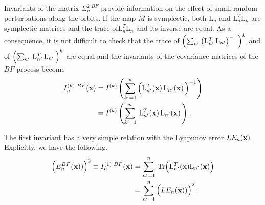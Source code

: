 Invariants of the matrix $\Sigma^{2\,\,BF}_n$ provide
information on the effect of small random perturbations along the orbits. If the map $M$ is symplectic, both $\mathrm{L}_n$ and $\mathrm{L}_n^T\mathrm{L}_n$ are symplectic matrices and the trace of$\mathrm{L}_n^T\mathrm{L}_n$ and its inverse are equal. As a consequence, it is not difficult to check that the trace of $\Bigl(\sum_{n'}\,\bigl(\mathrm{L}_{n'}^T\,\mathrm{L}_{n'}\bigr)^{-1}\,\Bigr)^k$ and of $\Bigl(\sum_{n'}\, \mathrm{L}_{n'}^T\,\mathrm{L}_{n'}\,\Bigr)^k$ are equal and the invariants of the covariance matrices of the $BF$ process become
%
\begin{equation}
 \begin{aligned}
   I^{(k)\,\,BF}_n(\vb{x})&= I^{(k)} \parton{\sum_{k'=1}^n\,\Bigl(\mathrm{L}_{n'}^T(\vb{x})\,\mathrm{L}_{n'}(\vb{x})\,\Bigr)^{-1}} \\%
   & =I^{(k)} \parton{\sum_{k'=1}^n\,\mathrm{L}_{n'}^T(\vb{x})\,\mathrm{L}_{n'}(\vb{x})\,} \, . \\
 \end{aligned}
\label{eq2_18}
\end{equation}
%

The first invariant has a very simple relation with the Lyapunov error $LE_n(\vb{x})$. Explicitly, we have the following.
%
\begin{equation}
 \begin{aligned}
   \Bigl(E^{BF}_n (\vb{x}))\Bigr)^2  \equiv I^{(1)\,\,BF}_n(\vb{x}) &= \sum_{n'=1}^n \,\Tr \Bigl(\mathrm{L}^T_{n'}(\vb{x})
   \mathrm{L}_{n'}(\vb{x}) \Bigr) \\
   &=  \sum_{n'=1}^n \,  \Bigl(LE_n (\vb{x}))\Bigr)^2 \,. \\ 
 \end{aligned}
\label{eq2_19}
\end{equation}
%

